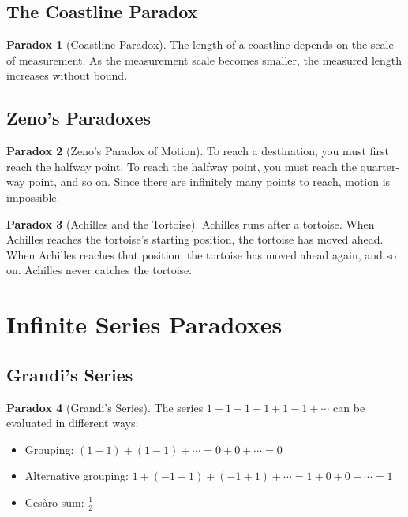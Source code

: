 \documentclass[11pt]{article}
\theoremstyle{definition}
\newtheorem{paradox}{Paradox}[section]
\begin{document}
\subsection{The Coastline Paradox}
\begin{paradox}[Coastline Paradox]
The length of a coastline depends on the scale of measurement. As the measurement scale becomes smaller, the measured length increases without bound.
\end{paradox}

\subsection{Zeno's Paradoxes}
\begin{paradox}[Zeno's Paradox of Motion]
To reach a destination, you must first reach the halfway point. To reach the halfway point, you must reach the quarter-way point, and so on. Since there are infinitely many points to reach, motion is impossible.
\end{paradox}

\begin{paradox}[Achilles and the Tortoise]
Achilles runs after a tortoise. When Achilles reaches the tortoise's starting position, the tortoise has moved ahead. When Achilles reaches that position, the tortoise has moved ahead again, and so on. Achilles never catches the tortoise.
\end{paradox}

\section{Infinite Series Paradoxes}

\subsection{Grandi's Series}
\begin{paradox}[Grandi's Series]
The series $1 - 1 + 1 - 1 + 1 - 1 + \cdots$ can be evaluated in different ways:
\begin{itemize}
    \item Grouping: $(1-1) + (1-1) + \cdots = 0 + 0 + \cdots = 0$
    \item Alternative grouping: $1 + (-1+1) + (-1+1) + \cdots = 1 + 0 + 0 + \cdots = 1$
    \item Cesàro sum: $\frac{1}{2}$
\end{itemize}
\end{paradox}
\end{document}
